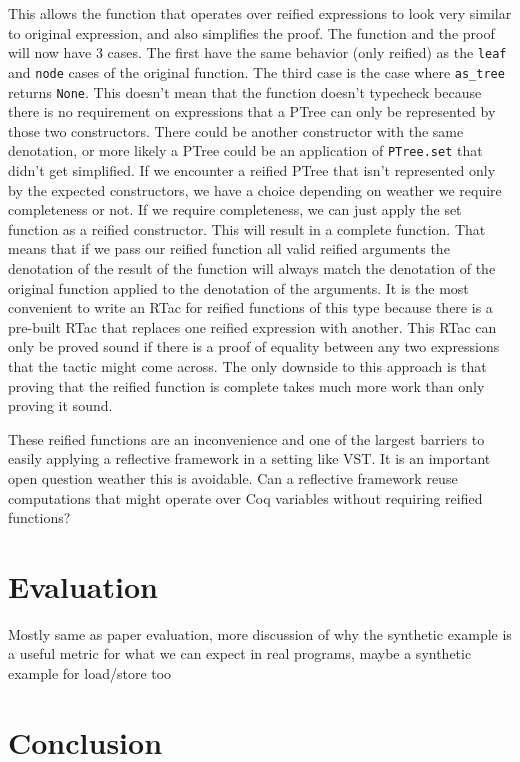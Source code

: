 \documentclass{puthesis}
\begin{document}
This allows the function that operates over reified expressions to look very
similar to original expression, and also simplifies the proof. The function
and the proof will now have 3 cases. The first have the same behavior (only reified)
as the \lstinline|leaf| and \lstinline|node| cases of the original function. The third
case is the case where \lstinline|as_tree| returns \lstinline|None|. This doesn't
mean that the function doesn't typecheck because there is no requirement on 
expressions that a PTree can only be represented by those two constructors. There
could be another constructor with the same denotation, or more likely a PTree
could be an application of \lstinline|PTree.set| that didn't get simplified.
If we encounter a reified PTree that isn't represented
only by the expected constructors, we have a choice depending on
weather we require completeness or not. If we require completeness,
we can just apply the set function as a reified constructor. This
will result in a complete function. That means that if we
pass our reified function all valid reified arguments
the denotation of the result of the function will always
match the denotation of the original function applied
to the denotation of the arguments. It is the most convenient
to write an RTac for reified functions of this type because
there is a pre-built RTac that replaces one reified expression
with another. This RTac can only be proved sound if there is a proof
of equality between any two expressions that the tactic might come
across. The only downside to this approach is that proving that the
reified function is complete takes much more work than only proving it
sound. 

These reified functions are an inconvenience and one of the largest
barriers to easily applying a reflective framework in a setting like
VST. It is an important open question weather this is avoidable. Can
a reflective framework reuse computations that might operate
over Coq variables without requiring reified functions? 

\chapter{Evaluation}

Mostly same as paper evaluation, more discussion of why the synthetic
example is a useful metric for what we can expect in real programs, 
maybe a synthetic example for load/store too

\chapter{Conclusion}



\end{document}
